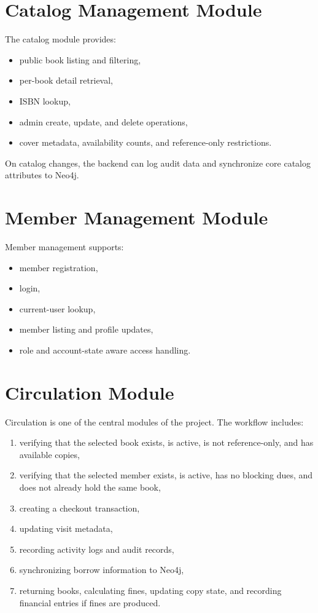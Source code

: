 \documentclass[12pt,a4paper]{report}
\begin{document}
\section{Catalog Management Module}
The catalog module provides:
\begin{itemize}[leftmargin=1.5em]
    \item public book listing and filtering,
    \item per-book detail retrieval,
    \item ISBN lookup,
    \item admin create, update, and delete operations,
    \item cover metadata, availability counts, and reference-only restrictions.
\end{itemize}

On catalog changes, the backend can log audit data and synchronize core catalog attributes to Neo4j.

\section{Member Management Module}
Member management supports:
\begin{itemize}[leftmargin=1.5em]
    \item member registration,
    \item login,
    \item current-user lookup,
    \item member listing and profile updates,
    \item role and account-state aware access handling.
\end{itemize}

\section{Circulation Module}
Circulation is one of the central modules of the project. The workflow includes:
\begin{enumerate}[leftmargin=1.5em]
    \item verifying that the selected book exists, is active, is not reference-only, and has available copies,
    \item verifying that the selected member exists, is active, has no blocking dues, and does not already hold the same book,
    \item creating a checkout transaction,
    \item updating visit metadata,
    \item recording activity logs and audit records,
    \item synchronizing borrow information to Neo4j,
    \item returning books, calculating fines, updating copy state, and recording financial entries if fines are produced.
\end{enumerate}
\end{document}
